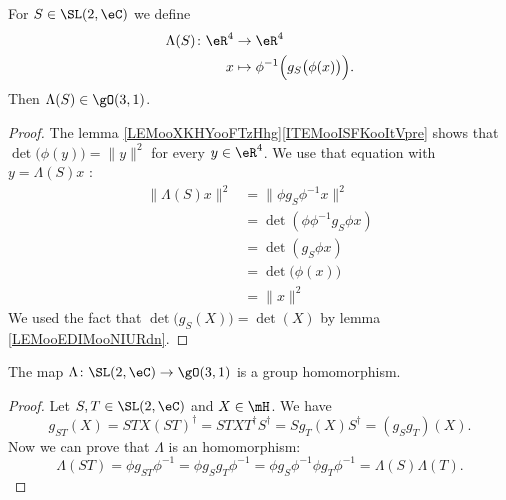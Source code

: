 \begin{lemma}       \label{LEMooXDPPooPImUQX}
	For \( S\in \SL(2,\eC)\) we define
	\begin{equation}
		\begin{aligned}
			\Lambda(S)\colon \eR^4 & \to \eR^4                                            \\
			x                      & \mapsto \phi^{-1}\Big( g_S\big( \phi(x) \big) \Big).
		\end{aligned}
	\end{equation}
	Then \( \Lambda(S)\in \gO(3,1)\).
\end{lemma}

\begin{proof}
	The lemma \ref{LEMooXKHYooFTzHhg}\ref{ITEMooISFKooItVpre} shows that \( \det\big( \phi(y) \big)=\| y \|^2\) for every \( y\in \eR^4\). We use that equation with \( y=\Lambda(S)x\) :
	\begin{subequations}
		\begin{align}
			\| \Lambda(S)x \|^2 & =\| \phi g_S\phi^{-1} x \|^2  \\
			                    & =\det(\phi\phi^{-1}g_S\phi x) \\
			                    & =\det(g_S\phi x)              \\
			                    & =\det\big( \phi(x) \big)      \\
			                    & =\| x \|^2
		\end{align}
	\end{subequations}
	We used the fact that \( \det\big( g_S(X) \big)=\det(X)\) by lemma \ref{LEMooEDIMooNIURdn}.
\end{proof}

\begin{lemma}           \label{LEMooJBYDooSFEUFr}
	The map \( \Lambda\colon \SL(2,\eC)\to \gO(3,1)\) is a group homomorphism.
\end{lemma}

\begin{proof}
	Let \( S,T\in \SL(2,\eC)\) and \( X\in \mH\). We have
	\begin{equation}
		g_{ST}(X)=STX(ST)^{\dag}=STXT^{\dag}S^{\dag}=Sg_T(X)S^{\dag}=(g_Sg_T)(X).
	\end{equation}
	Now we can prove that \( \Lambda\) is an homomorphism:
	\begin{equation}
		\Lambda(ST)=\phi g_{ST}\phi^{-1}=\phi g_Sg_T\phi^{-1}=\phi g_S\phi^{-1}\phi g_T\phi^{-1}=\Lambda(S)\Lambda(T).
	\end{equation}
\end{proof}

